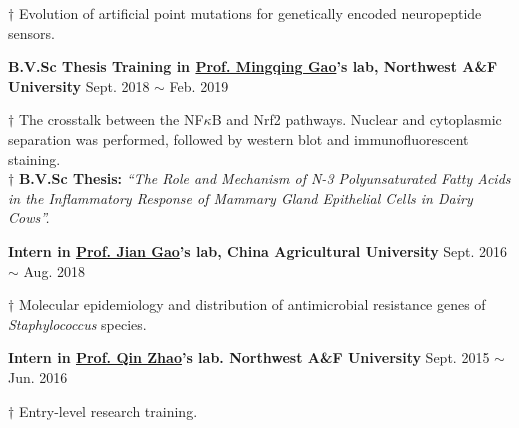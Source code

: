{\small
$\dagger$ Evolution of artificial point mutations for genetically encoded neuropeptide sensors.
}


\vspace{5pt}


\textbf{B.V.Sc Thesis Training in \href{https://faculty.nwu.edu.cn/gaomingqing/zh_CN/index.htm}{Prof. Mingqing Gao}'s lab, Northwest A\&F University} \hfill Sept. 2018 $\sim$ Feb. 2019

{\small
$\dagger$ The crosstalk between the NF$\kappa$B and Nrf2 pathways. Nuclear and cytoplasmic separation was performed, followed by western blot and immunofluorescent staining.\\
$\dagger$ \textbf{B.V.Sc Thesis:} \textit{``The Role and Mechanism of N-3 Polyunsaturated Fatty Acids in the Inflammatory Response of Mammary Gland Epithelial Cells in Dairy Cows''.}
}


\vspace{5pt}


\textbf{Intern in \href{https://cvm.cau.edu.cn/art/2017/9/12/art_41957_71.html}{Prof. Jian Gao}'s lab, China Agricultural University} \hfill Sept. 2016 $\sim$ Aug. 2018

{\small
$\dagger$ Molecular epidemiology and distribution of antimicrobial resistance genes of \textit{Staphylococcus} species\cite{zhao2018detection,qu2019molecular}.
}

\vspace{5pt}

\textbf{Intern in \href{https://dyxy.nwsuaf.edu.cn/en/People/FullProfessor/5e6012bf013a499c946289472b285795.htm}{Prof. Qin Zhao}'s lab. Northwest A\&F University} \hfill Sept. 2015 $\sim$ Jun. 2016

{\small
$\dagger$ Entry-level research training.
}